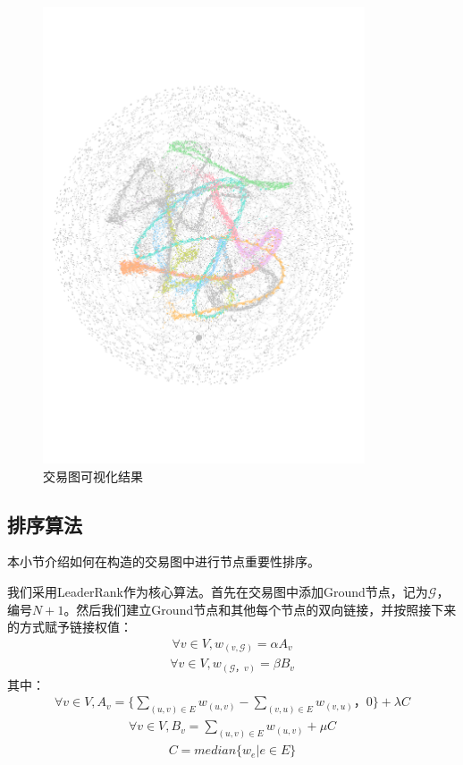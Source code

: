 \begin{figure}
	\centering
	\includegraphics[width=0.85\textwidth]{figs/wgc.pdf}
	\caption{交易图可视化结果}\label{fig:wgc}
\end{figure}


\subsection{排序算法} \label{subsec:leaderrank}
本小节介绍如何在构造的交易图中进行节点重要性排序。

我们采用LeaderRank\cite{Chen2013}\cite{Li2014}作为核心算法。首先在交易图中添加Ground节点，记为$\mathcal{G}$，编号$N+1$。然后我们建立Ground节点和其他每个节点的双向链接，并按照接下来的方式赋予链接权值：
\begin{align}\label{formula:weight1}
	\forall v \in V, w_{(v, \mathcal{G})} = \alpha A_v
\end{align}
\begin{align}\label{formula:weight2}
\forall v \in V,  w_{(\mathcal{G}， v)} = \beta B_v
\end{align}
其中：
\begin{align}
	\forall v \in V, A_v = \{ \sum_{(u,v)\in E} w_{(u,v)} - \sum_{(v,u) \in E} w_{(v, u)}， 0 \} + \lambda C
\end{align}
\begin{align} \label{formula:b}
\forall v \in V,  B_v =  \sum_{(u,v) \in E} w_{(u,v)} + \mu C
\end{align}
\begin{align}
	C = median\{w_e| e \in E\}
\end{align}

